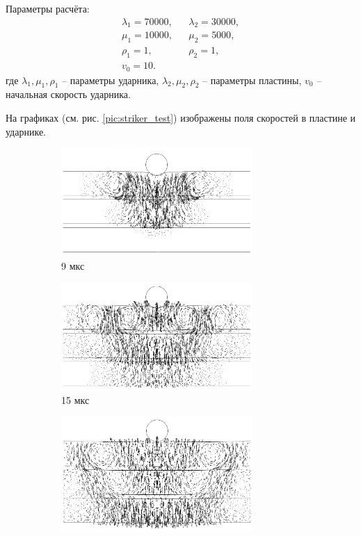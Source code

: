 Параметры расчёта:
\begin{align}
\lambda_1=70000, & & \lambda_2=30000, \nonumber\\
\mu_1=10000, & & \mu_2=5000, \nonumber\\
\rho_1=1, & & \rho_2=1, \nonumber\\
v_0 = 10. & &
\end{align}
где $\lambda_1, \mu_1, \rho_1$ -- параметры ударника, $\lambda_2, \mu_2, \rho_2$ -- параметры пластины, $v_0$ -- начальная скорость ударника.

На графиках (см. рис. \ref{pic:striker_test}) изображены поля скоростей в пластине и ударнике.

\clearpage
\newpage


\begin{figure}[ht]
\begin{subfigure}[b]{\textwidth}
\centering
\includegraphics[width=0.8\textwidth]{png/stounly-wave/01.png}
\caption{9 мкс}
\end{subfigure}
\begin{subfigure}[b]{\textwidth}
\centering
\includegraphics[width=0.8\textwidth]{png/stounly-wave/02.png}
\caption{15 мкс}
\end{subfigure}
\begin{subfigure}[b]{\textwidth}
\centering
\includegraphics[width=0.8\textwidth]{png/stounly-wave/03.png}

\end{subfigure}
\end{figure}
